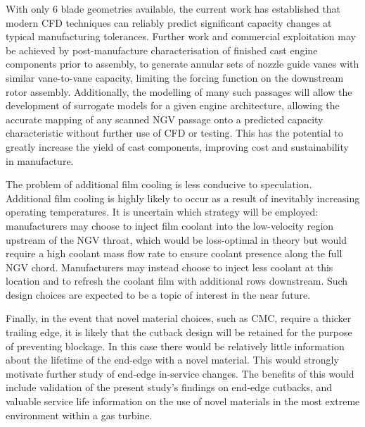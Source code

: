 \documentclass[a4paper, 11pt, oneside]{report}
\begin{document}
With only 6 blade geometries available, the current work has established that modern CFD techniques can reliably predict significant capacity changes at typical manufacturing tolerances.  Further work and commercial exploitation may be achieved by post-manufacture characterisation of finished cast engine components prior to assembly, to generate annular sets of nozzle guide vanes with similar vane-to-vane capacity, limiting the forcing function on the downstream rotor assembly.  Additionally, the modelling of many such passages will allow the development of surrogate models for a given engine architecture, allowing the accurate mapping of any scanned NGV passage onto a predicted capacity characteristic without further use of CFD or testing.  This has the potential to greatly increase the yield of cast components, improving cost and sustainability in manufacture.

The problem of additional film cooling is less conducive to speculation. Additional film cooling is highly likely to occur as a result of inevitably increasing operating temperatures. It is uncertain which strategy will be employed: manufacturers may choose to inject film coolant into the low-velocity region upstream of the NGV throat, which would be loss-optimal in theory but would require a high coolant mass flow rate to ensure coolant presence along the full NGV chord. Manufacturers may instead choose to inject less coolant at this location and to refresh the coolant film with additional rows downstream. Such design choices are expected to be a topic of interest in the near future.

Finally, in the event that novel material choices, such as CMC, require a thicker trailing edge, it is likely that the cutback design will be retained for the purpose of preventing blockage. In this case there would be relatively little information about the lifetime of the end-edge with a novel material. This would strongly motivate further study of end-edge in-service changes. The benefits of this would include validation of the present study's findings on end-edge cutbacks, and valuable service life information on the use of novel materials in the most extreme environment within a gas turbine.





\end{document}
